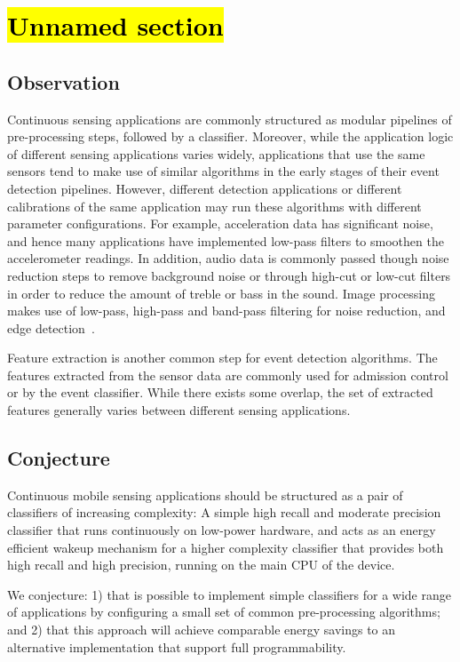 \section{\hl{Unnamed section}}
\label{sec:conjecture}


\subsection{Observation}

Continuous sensing applications are commonly structured
as modular pipelines of pre-processing steps, followed by a classifier. 
Moreover, while the application logic of different sensing applications
varies widely, applications that use the same sensors tend to make use
of similar algorithms in the early stages of their event detection
pipelines. However, different detection applications or different calibrations
of the same application may run these algorithms with different parameter
configurations. For example, acceleration data has significant noise, and 
hence many applications have implemented low-pass filters to smoothen the accelerometer
readings. In addition, audio data is commonly passed though noise reduction steps to 
remove background noise or through high-cut or
low-cut filters in order to reduce the amount of treble or bass in the
sound.  Image processing makes use of low-pass, high-pass and
band-pass filtering for noise reduction, and edge
detection~\cite{paul2005computer,marr1980theory}.

Feature extraction is another common step for event detection algorithms. 
The features extracted from the sensor data are commonly used for admission
control or by the event classifier. While there exists some overlap, the set
of extracted features generally varies between different sensing applications.

\subsection{Conjecture}

Continuous mobile sensing applications should be structured as a pair of 
classifiers of increasing complexity:  A simple high recall and moderate 
precision classifier that runs continuously on low-power hardware, and acts 
as an energy efficient wakeup mechanism for a higher complexity classifier 
that provides both high recall and high precision, running on the main CPU 
of the device.  

We conjecture: 1) that is possible to implement simple classifiers for a 
wide range of applications by configuring a small set of common pre-processing 
algorithms; and  2) that this approach will achieve comparable energy 
savings to an alternative implementation that support full programmability.

